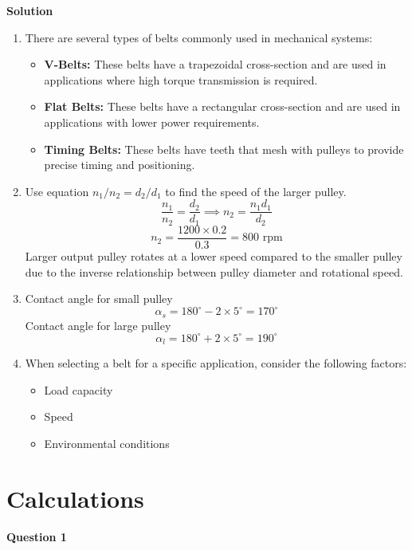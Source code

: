 \documentclass[a4paper, fleqn]{article}
\begin{document}
\textbf{Solution}
\begin{enumerate}
    \item There are several types of belts commonly used in mechanical systems:
    \begin{itemize}
        \item \textbf{V-Belts:} These belts have a trapezoidal cross-section and are used in applications where high torque transmission is required.
        \item \textbf{Flat Belts:} These belts have a rectangular cross-section and are used in applications with lower power requirements.
        \item \textbf{Timing Belts:} These belts have teeth that mesh with pulleys to provide precise timing and positioning.
    \end{itemize}
    \addtocounter{enumi}{2}
    \item Use equation $n_1/n_2 = d_2/d_1$ to find the speed of the larger pulley. \\
    $$
    \dfrac{n_1}{n_2} = \dfrac{d_2}{d_1} \implies n_2 = \dfrac{n_1 d_1}{d_2}
    $$
    $$
    n_2 = \dfrac{1200 \times 0.2}{0.3}= 800 \text{ rpm}
    $$
    Larger output pulley rotates at a lower speed compared to the smaller pulley due to the inverse relationship between pulley diameter and rotational speed.
    \item Contact angle for small pulley \\
    $$
    \alpha_s = 180^\circ - 2 \times 5^\circ = 170^\circ
    $$
    Contact angle for large pulley \\
    $$
    \alpha_l = 180^\circ + 2 \times 5^\circ = 190^\circ
    $$
    \item When selecting a belt for a specific application, consider the following factors:

        \begin{itemize}
            \item Load capacity
            \item Speed
            \item Environmental conditions
        \end{itemize}
\end{enumerate}

\newpage
\section*{Calculations}

\textbf{Question 1}
\end{document}
